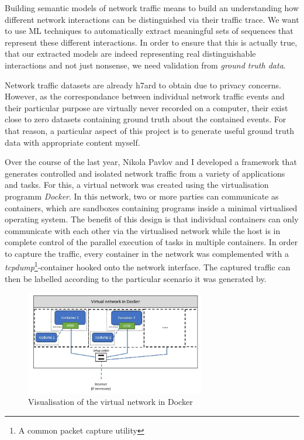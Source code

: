 \documentclass[a4paper,12pt,twoside]{report}
\begin{document}
Building semantic models of network traffic means to build an understanding how different network interactions can be distinguished via their traffic trace. We want to use ML techniques to automatically extract meaningful sets of sequences that represent these different interactions. In order to ensure that this is actually true, that our extracted models are indeed representing real distinguishable interactions and not just nonsense, we need validation from \textit{ground truth data}. 

Network traffic datasets are already h7ard to obtain due to privacy concerns. However, as  the correspondance between individual network traffic events and their particular purpose are virtually never recorded on a computer, their exist close to zero datasets containing ground truth about the contained events. For that reason, a particular aspect of this project is to generate useful ground truth data with appropriate content myself.

Over the course of the last year, Nikola Pavlov and I developed a framework that generates controlled and isolated network traffic from a variety of applications and tasks. For this, a virtual network was created using the virtualisation programm \textit{Docker}. In this network, two or more parties can communicate as containers,  which are sandboxes containing programs inside a minimal virtualised operating system. The benefit of this design is that individual containers can only communicate with each other via the virtualised network while the host is in complete control of the parallel execution of tasks in multiple containers. In order to capture the traffic, every container in the network was complemented with a \textit{tcpdump}\footnote{A common packet capture utility}-container hooked onto the network interface. The captured traffic can then be labelled according to the particular scenario it was generated by.


\begin{figure}\label{graph}
\centering
\includegraphics[width=0.7\textwidth]{images/Dockernet.jpg}
\caption{Visualisation of the virtual network in Docker}
\end{figure}
\end{document}
